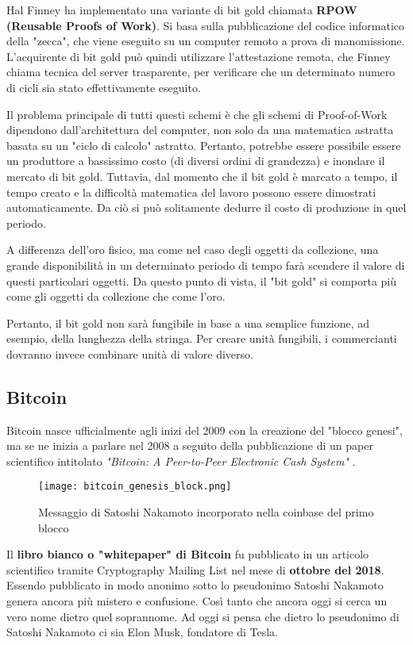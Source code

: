Hal Finney ha implementato una variante di bit gold chiamata \textbf{RPOW (Reusable Proofs of Work)}. Si basa sulla pubblicazione del codice informatico della "zecca", che viene eseguito su un computer remoto a prova di manomissione. L'acquirente di bit gold può quindi utilizzare l'attestazione remota, che Finney chiama tecnica del server trasparente, per verificare che un determinato numero di cicli sia stato effettivamente eseguito.

Il problema principale di tutti questi schemi è che gli schemi di Proof-of-Work dipendono dall'architettura del computer, non solo da una matematica astratta basata su un "ciclo di calcolo" astratto. Pertanto, potrebbe essere possibile essere un produttore a bassissimo costo (di diversi ordini di grandezza) e inondare il mercato di bit gold. Tuttavia, dal momento che il bit gold è marcato a tempo, il tempo creato e la difficoltà matematica del lavoro possono essere dimostrati automaticamente. Da ciò si può solitamente dedurre il costo di produzione in quel periodo.

A differenza dell'oro fisico, ma come nel caso degli oggetti da collezione, una grande disponibilità in un determinato periodo di tempo farà scendere il valore di questi particolari oggetti. Da questo punto di vista, il "bit gold" si comporta più come gli oggetti da collezione che come l'oro.

Pertanto, il bit gold non sarà fungibile in base a una semplice funzione, ad esempio, della lunghezza della stringa. Per creare unità fungibili, i commercianti dovranno invece combinare unità di valore diverso.

\subsection{Bitcoin}
Bitcoin nasce ufficialmente agli inizi del 2009 con la creazione del "blocco genesi", ma se ne inizia a parlare nel 2008 a seguito della pubblicazione di un paper scientifico intitolato \textit{"Bitcoin: A Peer-to-Peer Electronic Cash System"} \cite{bitcoin-white-paper}.

\begin{figure}[h]
  \centering
  \texttt{[image: bitcoin\_genesis\_block.png]}
  \caption{Messaggio di Satoshi Nakamoto incorporato nella coinbase del primo blocco}
  \label{fig:bitcoin_genesis_block}
\end{figure}

Il \textbf{libro bianco o "whitepaper" di Bitcoin} fu pubblicato in un articolo scientifico tramite Cryptography Mailing List nel mese di \textbf{ottobre del 2018}. Essendo pubblicato in modo anonimo sotto lo pseudonimo Satoshi Nakamoto genera ancora più mistero e confusione. Così tanto che ancora oggi si cerca un vero nome dietro quel soprannome. Ad oggi si pensa che dietro lo pseudonimo di Satoshi Nakamoto ci sia Elon Musk, fondatore di Tesla.


